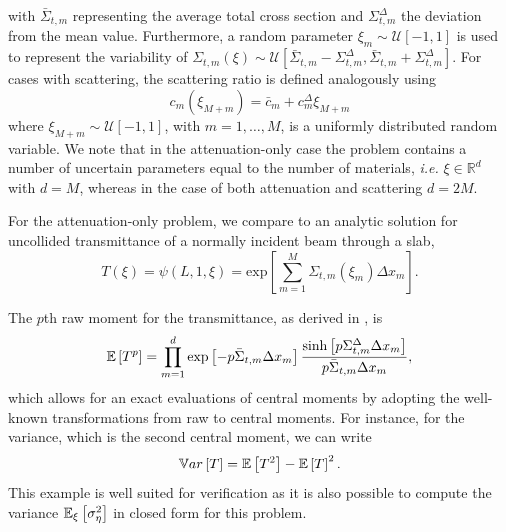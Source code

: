 with $\bar{\Sigma}_{t,m}$ representing the average total cross section and $\Sigma_{t,m}^{\Delta}$ the deviation from the mean value. Furthermore, a random parameter $\xi_m \sim \mathcal{U}[-1,1]$ is used to represent the variability of $\Sigma_{t,m}(\xi) \sim \mathcal{U}[ \bar{\Sigma}_{t,m}-\Sigma_{t,m}^{\Delta}, \bar{\Sigma}_{t,m}+\Sigma_{t,m}^{\Delta} ]$. For cases with scattering, the scattering ratio is defined analogously using 
\begin{equation}
	c_{m}(\xi_{M+m}) = \bar{c}_{m} + c_{m}^{\Delta}\xi_{M+m}
\end{equation} 
where $\xi_{M+m} \sim \mathcal{U}[-1,1]$, with $m=1,\dots,M$, is a uniformly distributed random variable. We note that in the attenuation-only case the problem contains a number of uncertain parameters equal to the number of materials, \textit{i.e.} $\xi \in \mathbb{R}^d$ with $d=M$, whereas in the case of both attenuation and scattering $d=2M$.   

For the attenuation-only problem, we compare to an analytic solution for uncollided transmittance of a normally incident beam through a slab,
\begin{equation}\label{eq:analytic-trans}
	T(\xi) = \psi(L, 1, \xi) = \text{exp} \left[ \sum_{m=1}^M \Sigma_{t,m}(\xi_m) \Delta x_m \right].
\end{equation}

\noindent The $p$th raw moment for the transmittance, as derived in \cite{OlsonANS2017}, is
\begin{equation}\label{eq:moment}
	\mathbb{E}\left[T^p\right] = \prod_{m=1}^d \exp \left[ -p \bar{\Sigma}_{t,m}\Delta x_m \right] \frac{\sinh \left[ p \Sigma_{t,m}^{\Delta} \Delta x_m \right]}{p \bar{\Sigma}_{t,m}\Delta x_m},
\end{equation}
\noindent which allows for an exact evaluations of central moments by adopting the well-known transformations from raw to central moments. For instance, for the variance, which is the second central moment, we can write
\begin{equation}
	\mathbb{V}ar\left[T\right] = \mathbb{E}\left[T^2\right] - \mathbb{E}\left[T\right]^2.
\end{equation}
This example is well suited for verification as it is also possible to compute the variance $\mathbb{E}_\xi\left[ \sigma^2_\eta \right]$ in closed form for this problem.

